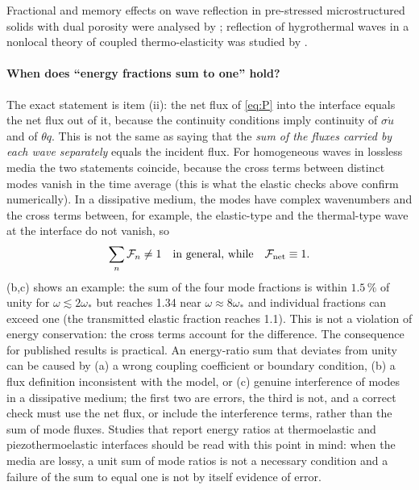 Fractional and memory effects on wave reflection in pre-stressed microstructured solids with dual porosity were analysed by \citep{Das2025}; reflection of hygrothermal waves in a nonlocal theory of coupled thermo-elasticity was studied by \citep{Yadav2022}.

\paragraph{When does ``energy fractions sum to one'' hold?} The exact statement is item (ii): the net flux of \eqref{eq:P} into the interface equals the net flux out of it, because the continuity conditions imply continuity of $\sigma\dot u$ and of $\theta q$. This is not the same as saying that the \emph{sum of the fluxes carried by each wave separately} equals the incident flux. For homogeneous waves in lossless media the two statements coincide, because the cross terms between distinct modes vanish in the time average (this is what the elastic checks above confirm numerically). In a dissipative medium, the modes have complex wavenumbers and the cross terms between, for example, the elastic-type and the thermal-type wave at the interface do not vanish, so
\begin{equation}
\sum_n\mathcal F_n\ne1\quad\text{in general, while}\quad \mathcal F_{\rm net}\equiv1.
\end{equation}
(b,c) shows an example: the sum of the four mode fractions is within $1.5\,\%$ of unity for $\omega\lesssim2\omega_*$ but reaches 1.34 near $\omega\approx8\omega_*$ and individual fractions can exceed one (the transmitted elastic fraction reaches 1.1). This is not a violation of energy conservation: the cross terms account for the difference. The consequence for published results is practical. An energy-ratio sum that deviates from unity can be caused by (a) a wrong coupling coefficient or boundary condition, (b) a flux definition inconsistent with the model, or (c) genuine interference of modes in a dissipative medium; the first two are errors, the third is not, and a correct check must use the net flux, or include the interference terms, rather than the sum of mode fluxes. Studies that report energy ratios at thermoelastic and piezothermoelastic interfaces \citep{Barak2023,Barak2023IJP,Barak2023JTS,Barak2023MMMS,Gupta2023Energy,Kumar2023PhysScr,Kumar2019,Kumar2022,Kumar2024,Kumar2024a} should be read with this point in mind: when the media are lossy, a unit sum of mode ratios is not a necessary condition and a failure of the sum to equal one is not by itself evidence of error.

